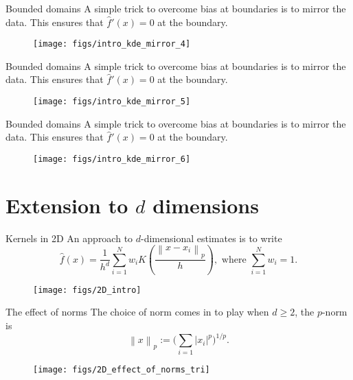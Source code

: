 \documentclass[11pt, aspectratio=149]{beamer}
\theoremstyle{plain}
\begin{document}
\begin{frame}[fragile, t]{Bounded domains}
	A simple trick to overcome bias at boundaries is to mirror the data.
	This ensures that $\hat{f}'(x) = 0$ at the boundary.
	\vfill
	\begin{figure}
		\centering
		\texttt{[image: figs/intro\_kde\_mirror\_4]}
	\end{figure}
\end{frame}

\begin{frame}[fragile, t]{Bounded domains}
	A simple trick to overcome bias at boundaries is to mirror the data.
	This ensures that $\hat{f}'(x) = 0$ at the boundary.
	\vfill
	\begin{figure}
		\centering
		\texttt{[image: figs/intro\_kde\_mirror\_5]}
	\end{figure}
\end{frame}

\begin{frame}[fragile, t]{Bounded domains}
	A simple trick to overcome bias at boundaries is to mirror the data.
	This ensures that $\hat{f}'(x) = 0$ at the boundary.
	\vfill
	\begin{figure}
		\centering
		\texttt{[image: figs/intro\_kde\_mirror\_6]}
	\end{figure}
\end{frame}


\section{Extension to $d$ dimensions}


\begin{frame}[fragile, t]{Kernels in 2D}
	An approach to $d$-dimensional estimates is to  write
	\begin{equation*}
	\hat{f}(x) = \frac{1}{h^d} \sum_{i=1}^{N} w_i K \left(\frac{\left \| x - x_i \right \|_p}{h}\right), \text{ where } \sum_{i=1}^{N} w_i = 1.
	\end{equation*}
	\vfill
	\begin{figure}
		\centering
		\texttt{[image: figs/2D\_intro]}
	\end{figure}
\end{frame}


\begin{frame}[fragile, t]{The effect of norms}
	The choice of norm comes in to play when $d \geq 2$, the $p$-norm is 
	\begin{equation*}
		\left\| x \right\| _p := \bigg( \sum_{i=1} \left| x_i \right| ^p \bigg) ^{1/p}.
	\end{equation*}
	\vfill
	\begin{figure}
		\centering
		\texttt{[image: figs/2D\_effect\_of\_norms\_tri]}
	\end{figure}
\end{frame}
\end{document}
